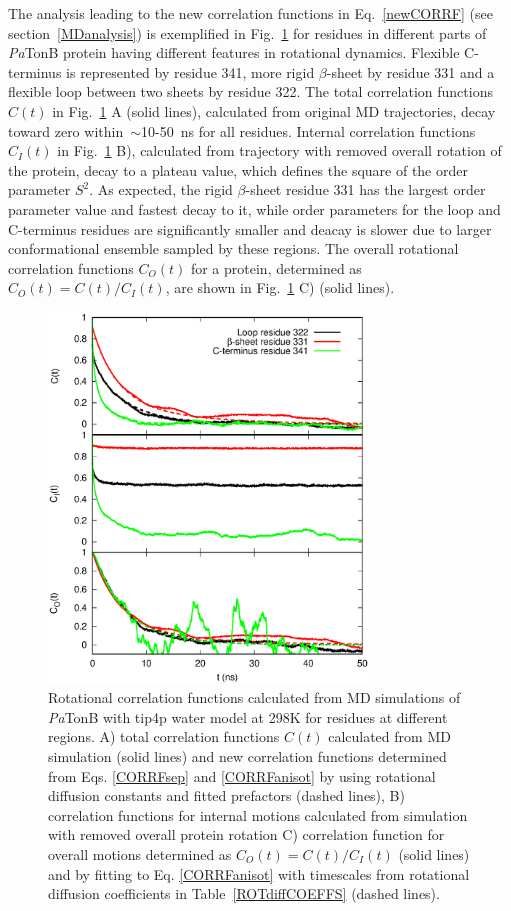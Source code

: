 \documentclass[pre,aps,floatfix,authordate1-4,twocolumn]{revtex4-1}
\begin{document}
The analysis leading to the new correlation functions in Eq.~\ref{newCORRF}
(see section~\ref{MDanalysis}) is exemplified in
Fig.~\ref{exampleCORRF} for residues in different parts of {\it Pa}TonB
protein having different features in rotational dynamics.
Flexible C-terminus is represented by residue 341,
more rigid $\beta$-sheet by residue 331 and a
flexible loop between two sheets by residue 322. 
The total correlation functions $C(t)$ in Fig.~\ref{exampleCORRF} A (solid lines),
calculated from original MD trajectories,
decay toward zero within~$\sim$10-50~ns for all residues. 
Internal correlation functions $C_I(t)$ in Fig.~\ref{exampleCORRF} B),
calculated from trajectory with removed overall rotation of the protein,
decay to a plateau value, which defines the square of the order parameter $S^2$.
As expected, the rigid $\beta$-sheet residue 331 has the largest order parameter value
and fastest decay to it, while order parameters for the loop and C-terminus residues are
significantly smaller and deacay is slower due to larger conformational ensemble
sampled by these regions. The overall rotational correlation functions $C_O(t)$
for a protein, determined as $C_O(t)=C(t)/C_I(t)$, are shown in Fig.~\ref{exampleCORRF} C) (solid lines).
\begin{figure}[!h]
  \includegraphics[width=8.5cm]{../Figs/exampleCORRF2.eps}%
  \caption{Rotational correlation functions calculated from MD simulations of {\it Pa}TonB with tip4p water
    model at 298K for residues at different regions.
    A) total correlation functions $C(t)$ calculated from MD simulation (solid lines) and
    new correlation functions determined from Eqs. \ref{CORRFsep} and \ref{CORRFanisot} by
    using rotational diffusion constants and fitted prefactors (dashed lines),
    B) correlation functions for internal motions calculated from simulation with removed overall protein rotation
    C) correlation function for overall motions determined as $C_O(t)=C(t)/C_I(t)$ (solid lines) and by fitting
    to Eq. \ref{CORRFanisot} with timescales from rotational diffusion coefficients in Table~\ref{ROTdiffCOEFFS} (dashed lines).
    }\label{exampleCORRF}
\end{figure}
\end{document}
